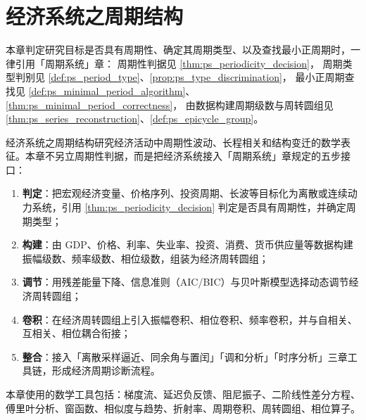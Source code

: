 \chapter{经济系统之周期结构}

\begin{remark}[本章目标的周期性判定（引用）]\label{rem:econ_ps_hook}
本章判定研究目标是否具有周期性、确定其周期类型、以及查找最小正周期时，一律引用「周期系统」章：
周期性判据见 \cref{thm:ps_periodicity_decision}，
周期类型判别见 \cref{def:ps_period_type}、\cref{prop:ps_type_discrimination}，
最小正周期查找见 \cref{def:ps_minimal_period_algorithm}、\cref{thm:ps_minimal_period_correctness}，
由数据构建周期级数与周转圆组见 \cref{thm:ps_series_reconstruction}、\cref{def:ps_epicycle_group}。
\end{remark}

\begin{remark}\label{rem:econ_five_steps_positioning}
经济系统之周期结构研究经济活动中周期性波动、长程相关和结构变迁的数学表征。本章不另立周期性判据，而是把经济系统接入「周期系统」章规定的五步接口：
\begin{enumerate}[label=(\arabic*)]
    \item \textbf{判定}：把宏观经济变量、价格序列、投资周期、长波等目标化为离散或连续动力系统，引用 \cref{thm:ps_periodicity_decision} 判定是否具有周期性，并确定周期类型；
    \item \textbf{构建}：由 GDP、价格、利率、失业率、投资、消费、货币供应量等数据构建振幅级数、频率级数、相位级数，组装为经济周转圆组；
    \item \textbf{调节}：用残差能量下降、信息准则（AIC/BIC）与贝叶斯模型选择动态调节经济周转圆组；
    \item \textbf{卷积}：在经济周转圆组上引入振幅卷积、相位卷积、频率卷积，并与自相关、互相关、相位耦合衔接；
    \item \textbf{整合}：接入「离散采样逼近、同余角与置闰」「调和分析」「时序分析」三章工具链，形成经济周期诊断流程。
\end{enumerate}
本章使用的数学工具包括：梯度流、延迟负反馈、阻尼振子、二阶线性差分方程、傅里叶分析、窗函数、相似度与趋势、折射率、周期卷积、周转圆组、相位算子。
\end{remark}

